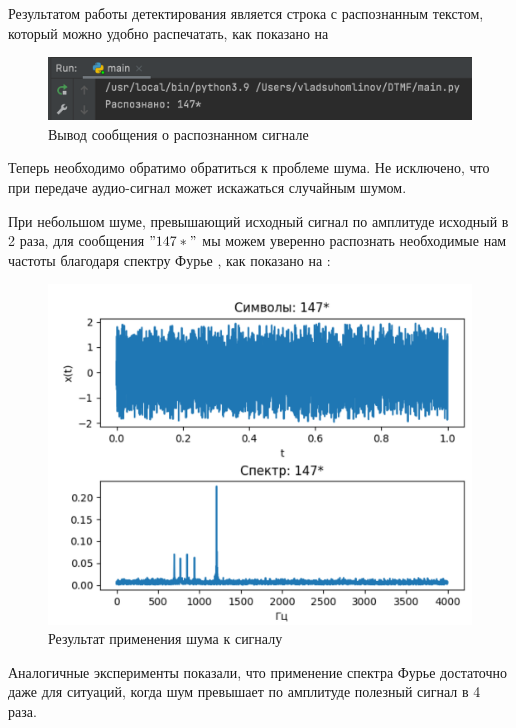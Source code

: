 Результатом работы детектирования является строка с распознанным текстом, который можно удобно распечатать, как показано на 

\begin{figure}[ht] 
	\center
	\includegraphics [scale=0.7] {my_folder/images/step-8}
	\caption{Вывод сообщения о распознанном сигнале} 
	\label{fig:step-8}
	\end{figure}

Теперь необходимо обратимо обратиться к проблеме шума. Не исключено, что при передаче аудио-сигнал может искажаться случайным шумом.

При небольшом шуме, превышающий исходный сигнал по амплитуде исходный в 2 раза, для сообщения $"147*"$ мы можем уверенно распознать необходимые нам частоты благодаря спектру Фурье \cite{book}, как показано на :

\begin{figure}[ht] 
	\center
	\includegraphics [scale=0.7] {my_folder/images/step-6}
	\caption{Результат применения шума к сигналу} 
	\label{fig:step-6}
	\end{figure}
	
Аналогичные эксперименты показали, что применение спектра Фурье достаточно даже для ситуаций, когда шум превышает по амплитуде полезный сигнал в 4 раза.

